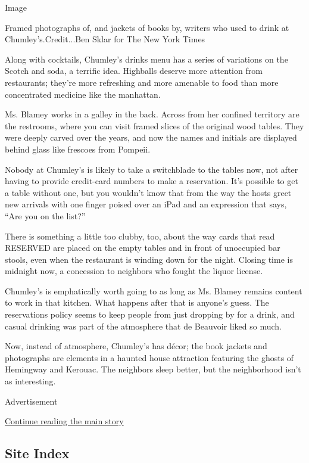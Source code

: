 Image

Framed photographs of, and jackets of books by, writers who used to
drink at Chumley's.Credit...Ben Sklar for The New York Times

Along with cocktails, Chumley's drinks menu has a series of variations
on the Scotch and soda, a terrific idea. Highballs deserve more
attention from restaurants; they're more refreshing and more amenable to
food than more concentrated medicine like the manhattan.

Ms. Blamey works in a galley in the back. Across from her confined
territory are the restrooms, where you can visit framed slices of the
original wood tables. They were deeply carved over the years, and now
the names and initials are displayed behind glass like frescoes from
Pompeii.

Nobody at Chumley's is likely to take a switchblade to the tables now,
not after having to provide credit-card numbers to make a reservation.
It's possible to get a table without one, but you wouldn't know that
from the way the hosts greet new arrivals with one finger poised over an
iPad and an expression that says, ``Are you on the list?''

There is something a little too clubby, too, about the way cards that
read RESERVED are placed on the empty tables and in front of unoccupied
bar stools, even when the restaurant is winding down for the night.
Closing time is midnight now, a concession to neighbors who fought the
liquor license.

Chumley's is emphatically worth going to as long as Ms. Blamey remains
content to work in that kitchen. What happens after that is anyone's
guess. The reservations policy seems to keep people from just dropping
by for a drink, and casual drinking was part of the atmosphere that de
Beauvoir liked so much.

Now, instead of atmosphere, Chumley's has décor; the book jackets and
photographs are elements in a haunted house attraction featuring the
ghosts of Hemingway and Kerouac. The neighbors sleep better, but the
neighborhood isn't as interesting.

Advertisement

\protect\hyperlink{after-bottom}{Continue reading the main story}

\hypertarget{site-index}{%
\subsection{Site Index}\label{site-index}}

